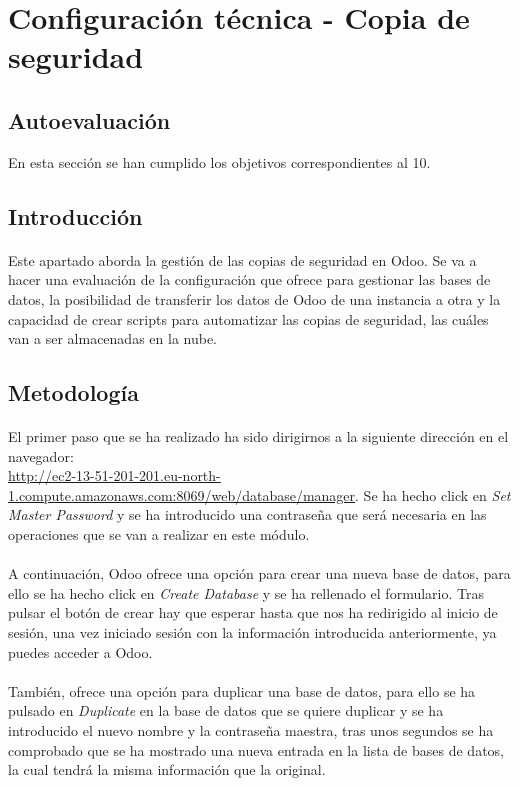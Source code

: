 \section{Configuración técnica - Copia de seguridad}
\subsection{Autoevaluación}
En esta sección se han cumplido los objetivos correspondientes al 10.
\subsection{Introducción}
\paragraph{}
Este apartado aborda la gestión de las copias de seguridad en Odoo. Se va a hacer una evaluación de la configuración que ofrece para gestionar las bases de datos, la posibilidad de transferir los datos de Odoo de una instancia a otra y la capacidad de crear scripts para automatizar las copias de seguridad, las cuáles van a ser almacenadas en la nube.
\subsection{Metodología}
\paragraph{}
El primer paso que se ha realizado ha sido dirigirnos a la siguiente dirección en el navegador:\\ \href{http://ec2-13-51-201-201.eu-north-1.compute.amazonaws.com:8069/web/database/manager}{http://ec2-13-51-201-201.eu-north-1.compute.amazonaws.com:8069/web/database/manager}. Se ha hecho click en \textit{Set Master Password} y se ha introducido una contraseña que será necesaria en las operaciones que se van a realizar en este módulo.
\paragraph{}
A continuación, Odoo ofrece una opción para crear una nueva base de datos, para ello se ha hecho click en \textit{Create Database} y se ha rellenado el formulario. Tras pulsar el botón de crear hay que esperar hasta que nos ha redirigido al inicio de sesión, una vez iniciado sesión con la información introducida anteriormente, ya puedes acceder a Odoo. 
\paragraph{}
También, ofrece una opción para duplicar una base de datos, para ello se ha pulsado en \textit{Duplicate} en la base de datos que se quiere duplicar y se ha introducido el nuevo nombre y la contraseña maestra, tras unos segundos se ha comprobado que se ha mostrado una nueva entrada en la lista de bases de datos, la cual tendrá la misma información que la original.
